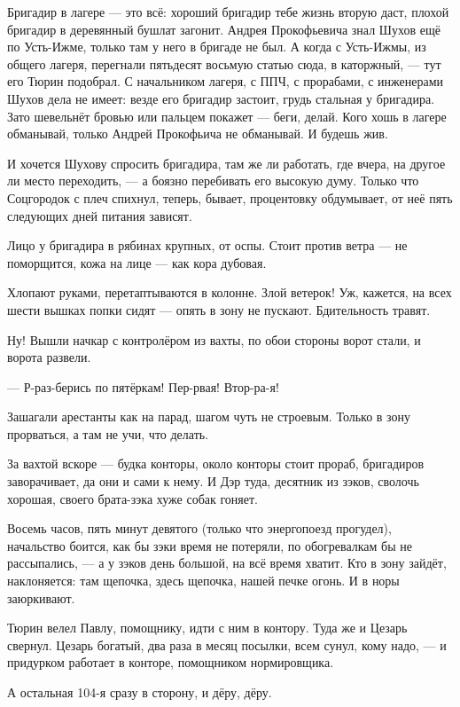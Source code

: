 Бригадир в лагере --- это всё: хороший бригадир тебе жизнь вторую даст, плохой бригадир в 
деревянный бушлат загонит. Андрея Прокофьевича знал Шухов ещё по Усть-Ижме, только там у 
него в бригаде не был. А когда с Усть-Ижмы, из общего лагеря, перегнали пятьдесят восьмую 
статью сюда, в каторжный, --- тут его Тюрин подобрал. С начальником лагеря, с ППЧ, с прорабами, с 
инженерами Шухов дела не имеет: везде его бригадир застоит, грудь стальная у бригадира. Зато 
шевельнёт бровью или пальцем покажет --- беги, делай. Кого хошь в лагере обманывай, только 
Андрей Прокофьича не обманывай. И будешь жив.

И хочется Шухову спросить бригадира, там же ли работать, где вчера, на другое ли место 
переходить, --- а боязно перебивать его высокую думу. Только что Соцгородок с плеч спихнул, 
теперь, бывает, процентовку обдумывает, от неё пять следующих дней питания зависят.

Лицо у бригадира в рябинах крупных, от оспы. Стоит против ветра --- не поморщится, кожа на лице 
--- как кора дубовая.

Хлопают руками, перетаптываются в колонне. Злой ветерок! Уж, кажется, на всех шести вышках 
попки сидят --- опять в зону не пускают. Бдительность травят.

Ну! Вышли начкар с контролёром из вахты, по обои стороны ворот стали, и ворота развели.

--- Р-раз-берись по пятёркам! Пер-рвая! Втор-ра-я!

Зашагали арестанты как на парад, шагом чуть не строевым. Только в зону прорваться, а там не 
учи, что делать.

За вахтой вскоре --- будка конторы, около конторы стоит прораб, бригадиров заворачивает, да 
они и сами к нему. И Дэр туда, десятник из зэков, сволочь хорошая, своего брата-зэка хуже собак 
гоняет.

Восемь часов, пять минут девятого (только что энергопоезд прогудел), начальство боится, как 
бы зэки время не потеряли, по обогревалкам бы не рассыпались, --- а у зэков день большой, на всё 
время хватит. Кто в зону зайдёт, наклоняется: там щепочка, здесь щепочка, нашей печке огонь. И 
в норы заюркивают.

Тюрин велел Павлу, помощнику, идти с ним в контору. Туда же и Цезарь свернул. Цезарь богатый, 
два раза в месяц посылки, всем сунул, кому надо, --- и придурком работает в конторе, помощником 
нормировщика.

А остальная 104-я сразу в сторону, и дёру, дёру.


